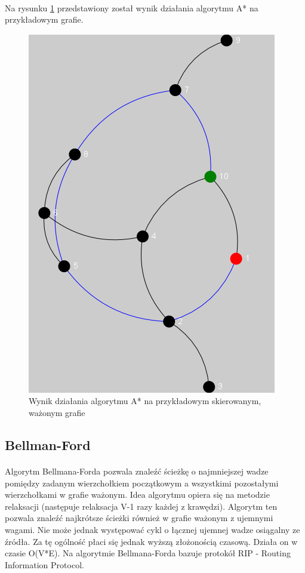 \paragraph{}
Na rysunku \ref{fig:aStar} przedstawiony został wynik działania algorytmu A* na przykładowym grafie.

\begin{figure}[!h]
 \centering
 \includegraphics{algorithms/dfs}
 \caption{Wynik działania algorytmu A* na przykładowym skierowanym, ważonym grafie}
 \label{fig:aStar}
\end{figure}

\subsection{Bellman-Ford}
\paragraph{}
Algorytm Bellmana-Forda pozwala znaleźć ścieżkę o najmniejszej wadze pomiędzy zadanym wierzchołkiem początkowym a wszystkimi pozostałymi
wierzchołkami w grafie ważonym.
Idea algorytmu opiera się na metodzie relaksacji (następuje relaksacja V-1 razy każdej z krawędzi).
Algorytm ten pozwala znaleźć najkrótsze ścieżki również w grafie ważonym z ujemnymi wagami. 
Nie może jednak występować cykl o łącznej ujemnej wadze osiągalny ze źródła. 
Za tę ogólność płaci się jednak wyższą złożonością czasową. 
Działa on w czasie O(V*E).
Na algorytmie Bellmana-Forda bazuje protokół RIP - Routing Information Protocol.

